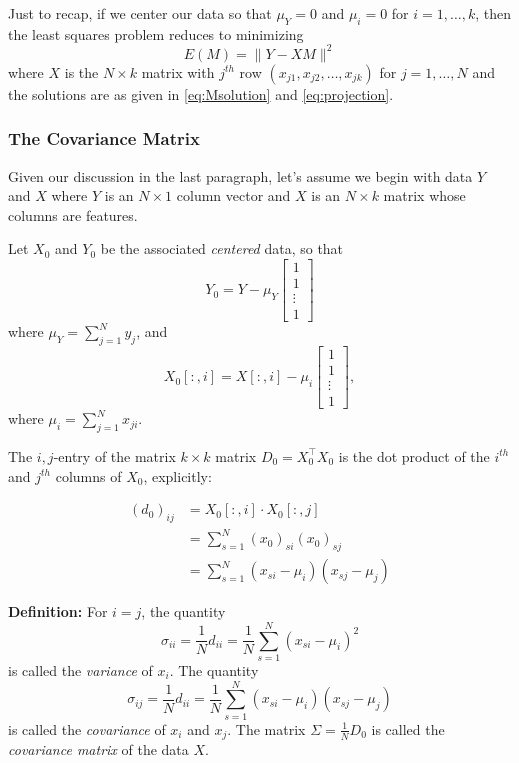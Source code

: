 \documentclass[]{article}
\begin{document}
Just to recap, if we center our data so that \(\mu_{Y}=0\) and
\(\mu_{i}=0\) for \(i=1,\ldots, k\), then the least squares problem
reduces to minimizing \[
E(M) = \|Y-XM\|^2
\] where \(X\) is the \(N\times k\) matrix with \(j^{th}\) row
\((x_{j1},x_{j2},\ldots, x_{jk})\) for \(j=1,\ldots, N\) and the
solutions are as given in \cref{eq:Msolution} and \cref{eq:projection}.

\hypertarget{the-covariance-matrix}{%
\subsubsection{The Covariance Matrix}\label{the-covariance-matrix}}

Given our discussion in the last paragraph, let's assume we begin with
data \(Y\) and \(X\) where \(Y\) is an \(N\times 1\) column vector and
\(X\) is an \(N\times k\) matrix whose columns are features.

Let \(X_{0}\) and \(Y_{0}\) be the associated \emph{centered} data, so
that \[
Y_{0} = Y -\mu_{Y}\left[\begin{matrix} 1 \\ 1 \\ \vdots \\ 1\end{matrix}\right]
\] where \(\mu_{Y} = \sum_{j=1}^{N} y_{j}\), and \[
X_0[:,i] = X[:,i] - \mu_{i}\left[\begin{matrix} 1 \\ 1 \\ \vdots \\ 1\end{matrix}\right],
\] where \(\mu_{i} = \sum_{j=1}^{N} x_{ji}\).

The \(i,j\)-entry of the matrix \(k\times k\) matrix
\(D_0=X_0^{\intercal}X_0\) is the dot product of the \(i^{th}\) and
\(j^{th}\) columns of \(X_{0}\), explicitly:

\[\begin{aligned}
(d_0)_{ij} & = X_0[:,i]\cdot X_0[:,j]\\
&= \sum_{s=1}^{N} (x_0)_{si}(x_0)_{sj} \\
&= \sum_{s=1}^{N} (x_{si}-\mu_{i})(x_{sj}-\mu_{j}) 
\end{aligned}
\]

\textbf{Definition:} For \(i=j\), the quantity \[
\sigma_{ii} = \frac{1}{N} d_{ii} =\frac{1}{N}\sum_{s=1}^{N} (x_{si}-\mu_{i})^2
\] is called the \emph{variance} of \(x_{i}\). The quantity \[
\sigma_{ij} = \frac{1}{N} d_{ii} =\frac{1}{N}\sum_{s=1}^{N} (x_{si}-\mu_{i}) (x_{sj}-\mu_{j})
\] is called the \emph{covariance} of \(x_{i}\) and \(x_{j}\). The
matrix \(\Sigma=\frac{1}{N}D_0\) is called the \emph{covariance matrix}
of the data \(X\).
\end{document}
